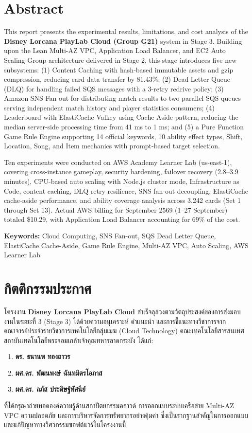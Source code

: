 \documentclass[12pt,a4paper]{report}
\begin{document}
\chapter*{Abstract}

This report presents the experimental results, limitations, and cost analysis of the \textbf{Disney Lorcana PlayLab Cloud (Group G21)} system in Stage 3. Building upon the Lean Multi-AZ VPC, Application Load Balancer, and EC2 Auto Scaling Group architecture delivered in Stage 2, this stage introduces five new subsystems: (1) Content Caching with hash-based immutable assets and gzip compression, reducing card data transfer by 81.43\%; (2) Dead Letter Queue (DLQ) for handling failed SQS messages with a 3-retry redrive policy; (3) Amazon SNS Fan-out for distributing match results to two parallel SQS queues serving independent match history and player statistics consumers; (4) Leaderboard with ElastiCache Valkey using Cache-Aside pattern, reducing the median server-side processing time from 41 ms to 1 ms; and (5) a Pure Function Game Rule Engine supporting 14 official keywords, 10 ability effect types, Shift, Location, Song, and Item mechanics with prompt-based target selection.

Ten experiments were conducted on AWS Academy Learner Lab (us-east-1), covering cross-instance gameplay, security hardening, failover recovery (2.8--3.9 minutes), CPU-based auto scaling with Node.js cluster mode, Infrastructure as Code, content caching, DLQ retry resilience, SNS fan-out decoupling, ElastiCache cache-aside performance, and ability coverage analysis across 3,242 cards (Set 1 through Set 13). Actual AWS billing for September 2569 (1--27 September) totaled \$10.29, with Application Load Balancer accounting for 69\% of the cost.

\vspace{0.6cm}
\noindent \textbf{Keywords:} Cloud Computing, SNS Fan-out, SQS Dead Letter Queue, ElastiCache Cache-Aside, Game Rule Engine, Multi-AZ VPC, Auto Scaling, AWS Learner Lab

\newpage

\chapter*{กิตติกรรมประกาศ}

โครงงาน \textbf{Disney Lorcana PlayLab Cloud} สำเร็จลุล่วงตามวัตถุประสงค์ของการส่งมอบงานในระยะที่ 3 (Stage 3) ได้ด้วยความอนุเคราะห์ คำแนะนำ และการชี้แนะทางวิชาการจากคณาจารย์ประจำรายวิชาการเทคโนโลยีกลุ่มเมฆ (Cloud Technology) คณะเทคโนโลยีสารสนเทศ สถาบันเทคโนโลยีพระจอมเกล้าเจ้าคุณทหารลาดกระบัง ได้แก่:
\begin{enumerate}
    \item \textbf{ดร. ธนานพ ทองถาวร}
    \item \textbf{ผศ.ดร. พัฒนพงษ์ ฉันทมิตรโอภาส}
    \item \textbf{ผศ.ดร. ลภัส ประดิษฐ์ทัศนีย์}
\end{enumerate}
ที่ได้กรุณาถ่ายทอดองค์ความรู้ด้านสถาปัตยกรรมคลาวด์ การออกแบบระบบเครือข่าย Multi-AZ VPC ความปลอดภัย และการบริหารจัดการทรัพยากรอย่างคุ้มค่า ซึ่งเป็นรากฐานสำคัญในการออกแบบและแก้ปัญหาทางวิศวกรรมซอฟต์แวร์ในโครงงานนี้
\end{document}
